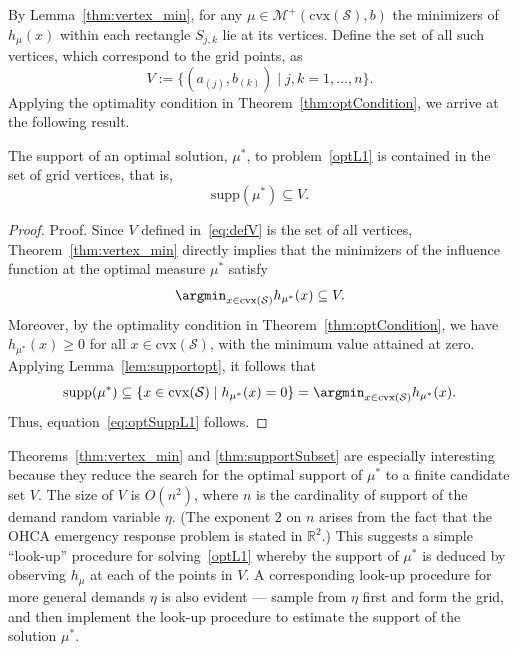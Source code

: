 \documentclass[stsy,sglanonrev]{informs4}
\begin{document}
By Lemma~\ref{thm:vertex_min}, for any $\mu\in\mathcal{M}^+(\mathrm{cvx}(\mathcal{S}), b)$ the minimizers of \( h_{\mu}(x) \) within each rectangle \( S_{j,k} \) lie at its vertices. Define the set of all such vertices, which correspond to the grid points, as  
\begin{equation}\label{eq:defV}
    V := \{ (a_{(j)}, b_{(k)}) \mid j, k = 1, \dots, n \}.
\end{equation}
Applying the optimality condition in Theorem~\ref{thm:optCondition}, we arrive at the following result.
\begin{theorem}\label{thm:supportSubset}
    The support of an optimal solution, \( \mu^* \), to problem~\eqref{optL1} is contained in the set of grid vertices, that is,
    \begin{equation}\label{eq:optSuppL1}
        \mathrm{supp}(\mu^*) \subseteq V.
    \end{equation}
\end{theorem}
\begin{proof}{Proof.}
Since \( V \) defined in~\eqref{eq:defV} is the set of all vertices, Theorem~\ref{thm:vertex_min} directly implies that the minimizers of the influence function at the optimal measure \( \mu^* \) satisfy
\begin{equation*}
    \argmin_{x\in\mathrm{cvx}(\mathcal{S})} h_{\mu^*}(x) \subseteq V.
\end{equation*}
Moreover, by the optimality condition in Theorem~\ref{thm:optCondition}, we have \( h_{\mu^*}(x) \geq 0 \) for all \( x \in \mathrm{cvx}(\mathcal{S}) \), with the minimum value attained at zero. Applying Lemma~\ref{lem:supportopt}, it follows that
\begin{equation*}
    \mathrm{supp}(\mu^*) \subseteq \left\{ x \in \mathrm{cvx}(\mathcal{S}) \mid h_{\mu^*}(x) = 0 \right\} = \argmin_{x \in \mathrm{cvx}(\mathcal{S})} h_{\mu^*}(x).
\end{equation*} Thus, equation~\eqref{eq:optSuppL1} follows. \hfill \Halmos
\end{proof}

Theorems~\ref{thm:vertex_min} and \ref{thm:supportSubset} are especially interesting because they reduce the search for the optimal support of $\mu^*$ to a finite candidate set $V$. The size of $V$ is $O(n^2)$, where $n$ is the cardinality of support of the demand random variable $\eta$. (The exponent $2$ on $n$ arises from the fact that the OHCA emergency response problem is stated in $\mathbb{R}^2$.) This suggests a simple ``look-up'' procedure for solving~\eqref{optL1} whereby the support of $\mu^*$ is deduced by observing $h_{\mu}$ at each of the points in $V$. %
A corresponding look-up procedure for more general demands $\eta$ is also evident --- sample from $\eta$ first and form the grid, and then implement the look-up procedure to estimate the support of the solution $\mu^*$.   
\end{document}
